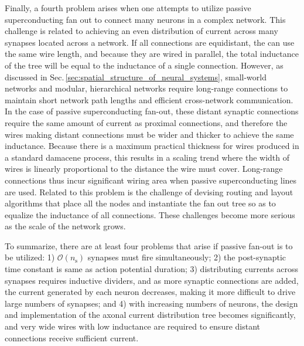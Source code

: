 Finally, a fourth problem arises when one attempts to utilize passive superconducting fan out to connect many neurons in a complex network. This challenge is related to achieving an even distribution of current across many synapses located across a network. If all connections are equidistant, the can use the same wire length, and because they are wired in parallel, the total inductance of the tree will be equal to the inductance of a single connection. However, as discussed in Sec.\,\ref{sec:spatial_structure_of_neural_systems}, small-world networks and modular, hierarchical networks require long-range connections to maintain short network path lengths and efficient cross-network communication. In the case of passive superconducting fan-out, these distant synaptic connections require the same amount of current as proximal connections, and therefore the wires making distant connections must be wider and thicker to achieve the same inductance. Because there is a maximum practical thickness for wires produced in a standard damacene process, this results in a scaling trend where the width of wires is linearly proportional to the distance the wire must cover. Long-range connections thus incur significant wiring area when passive superconducting lines are used. Related to this problem is the challenge of devising routing and layout algorithms that place all the nodes and instantiate the fan out tree so as to equalize the inductance of all connections. These challenges become more serious as the scale of the network grows.

To summarize, there are at least four problems that arise if passive fan-out is to be utilized: 1) $\mathcal{O}(n_{\mathrm{s}})$ synapses must fire simultaneously; 2) the post-synaptic time constant is same as action potential duration; 3) distributing currents across synapses requires inductive dividers, and as more synaptic connections are added, the current generated by each neuron decreases, making it more difficult to drive large numbers of synapses; and 4) with increasing numbers of neurons, the design and implementation of the axonal current distribution tree becomes significantly, and very wide wires with low inductance are required to ensure distant connections receive sufficient current.

